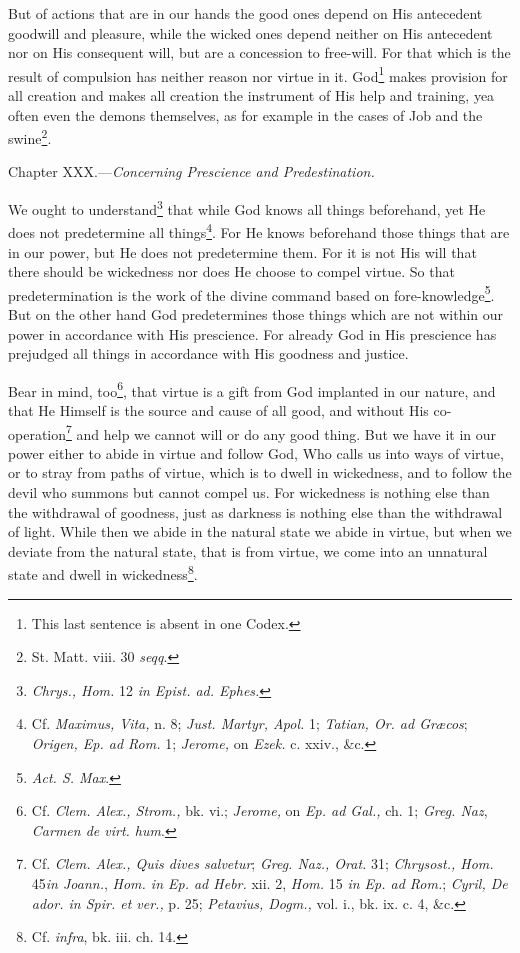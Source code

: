 But of actions that are in our hands the good ones depend on His antecedent goodwill and pleasure, while the wicked ones depend neither on His antecedent nor on His consequent will, but are a concession to free-will. For that which is the result of compulsion has neither reason nor virtue in it. God\footnote{This last sentence is absent in one Codex.} makes provision for all creation and makes all creation the instrument of His help and training, yea often even the demons themselves, as for example in the cases of Job and the swine\footnote{St. Matt. viii. 30 \emph{seqq}.}.


Chapter XXX.—\emph{Concerning Prescience and Predestination.}

We ought to understand\footnote{\emph{Chrys., Hom.} 12 \emph{in Epist. ad. Ephes.}} that while God knows all things beforehand, yet He does not predetermine all things\footnote{Cf. \emph{Maximus, Vita, }n. 8; \emph{Just. Martyr, Apol. }1; \emph{Tatian, Or. ad Græcos}; \emph{Origen, Ep. ad Rom. }1; \emph{Jerome, }on \emph{Ezek. }c. xxiv., \&c.}. For He knows beforehand those things that are in our power, but He does not predetermine them. For it is not His will that there should be wickedness nor does He choose to compel virtue. So that predetermination is the work of the divine command based on fore-knowledge\footnote{\emph{Act. S. Max}.}. But on the other hand God predetermines those things which are not within our power in accordance with His prescience. For already God in His prescience has prejudged all things in accordance with His goodness and justice.

Bear in mind, too\footnote{Cf. \emph{Clem. Alex., Strom., }bk. vi.; \emph{Jerome, }on \emph{Ep. ad Gal., }ch. 1; \emph{Greg. Naz}, \emph{Carmen de virt. hum}.}, that virtue is a gift from God implanted in our nature, and that He Himself is the source and cause of all good, and without His co-operation\footnote{Cf. \emph{Clem. Alex., Quis dives salvetur}; \emph{Greg. Naz., Orat. }31; \emph{Chrysost., Hom. }45\emph{in Joann.}, \emph{Hom. in Ep. ad Hebr. }xii. 2, \emph{Hom. }15 \emph{in Ep. ad Rom.}; \emph{Cyril, De ador. in Spir. et ver., }p. 25; \emph{Petavius, Dogm., }vol. i., bk. ix. c. 4, \&c.} and help we cannot will or do any good thing. But we have it in our power either to abide in virtue and follow God, Who calls us into ways of virtue, or to stray from paths of virtue, which is to dwell in wickedness, and to follow the devil who summons but cannot compel us. For wickedness is nothing else than the withdrawal of goodness, just as darkness is nothing else than the withdrawal of light. While then we abide in the natural state we abide in virtue, but when we deviate from the natural state, that is from virtue, we come into an unnatural state and dwell in wickedness\footnote{Cf. \emph{infra}, bk. iii. ch. 14.}.

